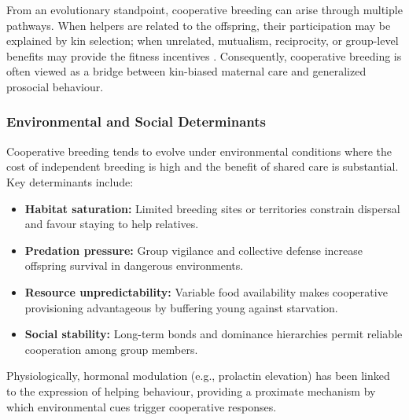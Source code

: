         From an evolutionary standpoint, cooperative breeding can arise through multiple pathways.  When helpers are related to the offspring, their participation may be explained by kin selection; when unrelated, mutualism, reciprocity, or group-level benefits may provide the fitness incentives \cite{griffe2003}.  Consequently, cooperative breeding is often viewed as a bridge between kin-biased maternal care and generalized prosocial behaviour.



        
        \subsubsection{Environmental and Social Determinants}
        Cooperative breeding tends to evolve under environmental conditions where the cost of independent breeding is high and the benefit of shared care is substantial. Key determinants include:
        \begin{itemize}
            \item \textbf{Habitat saturation:} Limited breeding sites or territories constrain dispersal and favour staying to help relatives.
            \item \textbf{Predation pressure:} Group vigilance and collective defense increase offspring survival in dangerous environments.
            \item \textbf{Resource unpredictability:} Variable food availability makes cooperative provisioning advantageous by buffering young against starvation.
            \item \textbf{Social stability:} Long-term bonds and dominance hierarchies permit reliable cooperation among group members.
        \end{itemize}
        Physiologically, hormonal modulation (e.g., prolactin elevation) has been linked to the expression of helping behaviour, providing a proximate mechanism by which environmental cues trigger cooperative responses.

